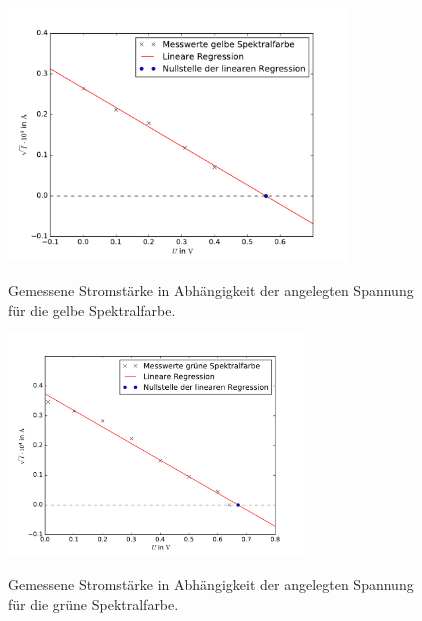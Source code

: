 \begin{figure}
  \centering
  \includegraphics[width = 0.8\textwidth]{Pics/gelbe_Spektrallinie.pdf} \\[0cm]
  \caption{Gemessene Stromstärke in Abhängigkeit der angelegten Spannung für die
           gelbe Spektralfarbe.}
  \label{fig:Gelb}
\end{figure}

\newpage




\begin{figure}
  \centering
  \includegraphics[width = 0.7\textwidth]{Pics/gruene_Spektrallinie.pdf}\\[0cm]
  \caption{Gemessene Stromstärke in Abhängigkeit der angelegten Spannung für die
           grüne Spektralfarbe.}
  \label{fig:Gruen}
\end{figure}

\newpage



